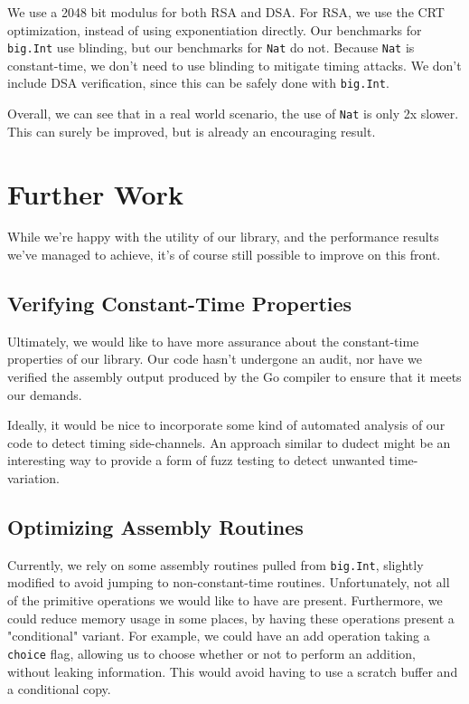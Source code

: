 \documentclass[11pt, a4paper]{article} %
\begin{document}
{We use a 2048 bit modulus for both RSA and DSA. For RSA, we use
the CRT optimization, instead of using exponentiation directly.
Our benchmarks for \texttt{big.Int} use blinding, but our benchmarks
for \texttt{Nat} do not. Because \texttt{Nat} is constant-time,
we don't need to use blinding to mitigate timing attacks.
We don't include DSA verification, since this can be safely done
with \texttt{big.Int}.

Overall, we can see that in a real world scenario, the use
of \texttt{Nat} is only 2x slower. This can surely be improved,
but is already an encouraging result.

\section{Further Work}

While we're happy with the utility of our library,
and the performance results we've managed to achieve, it's
of course still possible to improve on this front.

\subsection{Verifying Constant-Time Properties}

Ultimately, we would like to have more assurance about the
constant-time properties of our library. Our code hasn't
undergone an audit, nor have we verified the assembly output
produced by the Go compiler to ensure that it meets our demands.

Ideally, it would be nice to incorporate some kind of automated
analysis of our code to detect timing side-channels. An approach
similar to dudect
\cite{reparaz_dude_2017} 
might be an interesting way to provide a form of fuzz testing
to detect unwanted time-variation.

\subsection{Optimizing Assembly Routines}

Currently, we rely on some assembly routines pulled from
\texttt{big.Int}, slightly modified to avoid jumping to non-constant-time
routines. Unfortunately, not all of the primitive operations we would
like to have are present. Furthermore, we could reduce memory usage
in some places, by having these operations present a "conditional"
variant. For example, we could have an add operation taking a
\texttt{choice} flag, allowing us to choose whether or not to perform
an addition, without leaking information. This would avoid having
to use a scratch buffer and a conditional copy.

}
\end{document}
